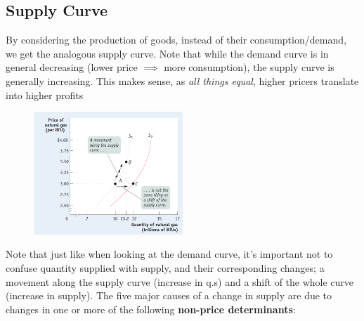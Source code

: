 \documentclass[english,course, draft]{Notes}
\newcommand{\ita}[1]{\textit{#1}}
\begin{document}
	
		
\subsection{Supply Curve}


\par{By considering the production of goods, instead of their consumption/demand, we get the analogous supply curve. Note that while the demand curve is in general decreasing (lower price $\implies$ more consumption), the supply curve is generally increasing. This makes sense, as \ita{all things equal}, higher pricers translate into higher profits}






\begin{figure}[ht]
\centering
\includegraphics[width=0.5\textwidth]{supplyCurve}
\end{figure}

\par{Note that just like when looking at the demand curve, it's important not to confuse quantity supplied with supply, and their corresponding changes; a movement along the supply curve (increase in q.s) and a shift of the whole curve (increase in supply). The five major causes of a change in supply are due to changes in one or more of the following \textbf{non-price determinants}:}
\end{document}
